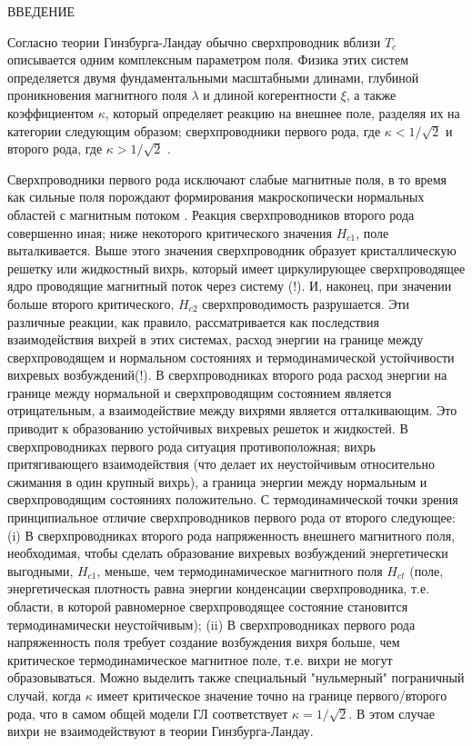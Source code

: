 \begin{center}
	ВВЕДЕНИЕ
\end{center}
\vspace*{1cm}

Согласно теории Гинзбурга-Ландау обычно сверхпроводник вблизи \( T_c \) 
описывается одним комплексным параметром поля. Физика этих систем определяется 
двумя фундаментальными масштабными длинами, глубиной проникновения магнитного 
поля \( \lambda \) и длиной когерентности \( \xi \), а также коэффициентом 
\( \kappa \), который определяет реакцию на внешнее поле, разделяя их на 
категории следующим образом; сверхпроводники первого рода, где 
\( \kappa < 1/\sqrt{2} \) и второго рода, где \( \kappa > 1/\sqrt{2} \) 
\cite{bib:3}.

Сверхпроводники первого рода исключают слабые магнитные поля, в то время как 
сильные поля порождают формирования макроскопически нормальных областей с 
магнитным потоком \cite{bib:4}. Реакция сверхпроводников второго рода 
совершенно иная; ниже некоторого критического значения \( H_{c1} \), поле 
выталкивается. Выше этого значения сверхпроводник образует кристаллическую 
решетку или жидкостный вихрь, который имеет циркулирующее сверхпроводящее 
ядро проводящие магнитный поток через систему (!). И, наконец, при значении 
больше второго критического, \( H_{c2} \) сверхпроводимость разрушается. Эти 
различные реакции, как правило, рассматривается как последствия взаимодействия 
вихрей в этих системах, расход энергии на границе между сверхпроводящем и 
нормальном состояниях и термодинамической устойчивости вихревых возбуждений(!). 
В сверхпроводниках второго рода расход энергии на границе между нормальной и 
сверхпроводящим состоянием является отрицательным, а взаимодействие между 
вихрями является отталкивающим\cite{bib:3}. Это приводит к образованию 
устойчивых вихревых решеток и жидкостей. В сверхпроводниках первого рода 
ситуация противоположная; вихрь притягивающего взаимодействия (что делает их 
неустойчивым относительно сжимания в один крупный вихрь), а граница энергии 
между нормальным и сверхпроводящим состояниях положительно. С термодинамической 
точки зрения принципиальное отличие сверхпроводников первого рода от второго 
следующее: (i) В сверхпроводниках второго рода напряженность внешнего 
магнитного поля, необходимая, чтобы сделать образование вихревых возбуждений 
энергетически выгодными, \( H_{c1} \), меньше, чем термодинамическое 
магнитного поля \( H_{ct} \) (поле, энергетическая плотность равна энергии 
конденсации сверхпроводника, т.е. области, в которой равномерное 
сверхпроводящее состояние становится термодинамически неустойчивым); (ii) В 
сверхпроводниках первого рода напряженность поля требует создание возбуждения 
вихря больше, чем критическое термодинамическое магнитное поле, т.е. вихри не
могут образовываться. Можно выделить также специальный "нульмерный" 
пограничный случай, когда \( \kappa \) имеет критическое значение точно на 
границе первого/второго рода, что в самом общей модели ГЛ соответствует 
\( \kappa = 1/\sqrt{2} \). В этом случае вихри не взаимодействуют\cite{bib:5} 
в теории Гинзбурга-Ландау.

